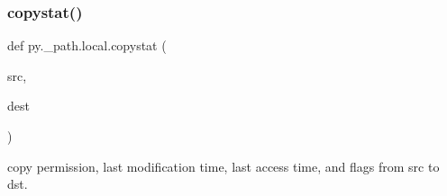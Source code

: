 \subsubsection{\texorpdfstring{copystat()}{copystat()}}
{\footnotesize\ttfamily def py.\+\_\+path.\+local.\+copystat (\begin{DoxyParamCaption}\item[{}]{src,  }\item[{}]{dest }\end{DoxyParamCaption})}

\begin{DoxyVerb}copy permission,  last modification time,
last access time, and flags from src to dst.\end{DoxyVerb}
 